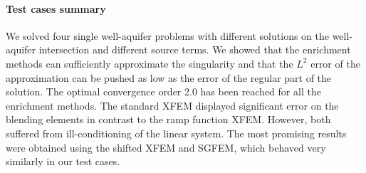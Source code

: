 
\paragraph{Test cases summary}
We solved four single well-aquifer problems with different solutions on the well-aquifer intersection and different source terms.
We showed that the enrichment methods can sufficiently approximate the singularity and that the $L^2$ error of the approximation
can be pushed as low as the error of the regular part of the solution. The optimal convergence order 2.0 has been reached for all
the enrichment methods. The standard XFEM displayed significant error on the blending elements in contrast to the ramp function XFEM.
However, both suffered from ill-conditioning of the linear system. The most promising results were obtained using the shifted XFEM
and SGFEM, which behaved very similarly in our test cases.


